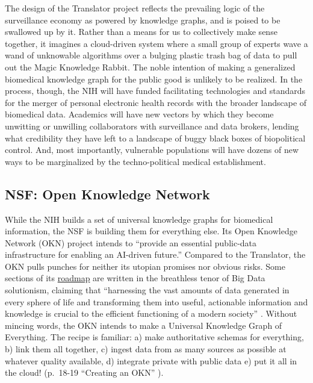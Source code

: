 \documentclass{article}
\begin{document}
The design of the Translator project reflects the prevailing logic of
the surveillance economy as powered by knowledge graphs, and is poised
to be swallowed up by it. Rather than a means for us to collectively
make sense together, it imagines a cloud-driven system where a small
group of experts wave a wand of unknowable algorithms over a bulging
plastic trash bag of data to pull out the Magic Knowledge Rabbit. The
noble intention of making a generalized biomedical knowledge graph for
the public good is unlikely to be realized. In the process, though, the
NIH will have funded facilitating technologies and standards for the
merger of personal electronic health records with the broader landscape
of biomedical data. Academics will have new vectors by which they become
unwitting or unwilling collaborators with surveillance and data brokers, lending what
credibility they have left to a landscape of buggy black boxes of
biopolitical control. And, most importantly, vulnerable populations will
have dozens of new ways to be marginalized by the techno-political
medical establishment.

\hypertarget{nsf-open-knowledge-network}{%
\subsection{NSF: Open Knowledge
Network}\label{nsf-open-knowledge-network}}

While the NIH builds a set of universal knowledge graphs for biomedical
information, the NSF is building them for everything else. Its Open
Knowledge Network (OKN) project intends to ``provide an essential
public-data infrastructure for enabling an AI-driven future.'' \cite{baruOpenKnowledgeNetwork2022}  Compared to the Translator, the OKN
pulls punches for neither its utopian promises nor obvious risks. Some
sections of its
\href{https://web.archive.org/web/20221028095757/https://nsf-gov-resources.nsf.gov/2022-09/OKN\%20Roadmap\%20-\%20Report_v03.pdf}{roadmap}
are written in the breathless tenor of Big Data solutionism, claiming
that ``harnessing the vast amounts of data generated in every sphere of
life and transforming them into useful, actionable information and
knowledge is crucial to the efficient functioning of a modern society''
\cite{baruOpenKnowledgeNetwork2022} . Without mincing words, the
OKN intends to make a Universal Knowledge Graph of Everything. The
recipe is familiar: a) make authoritative schemas for everything, b)
link them all together, c) ingest data from as many sources as possible
at whatever quality available, d) integrate private with public data e)
put it all in the cloud! (p.~18-19 ``Creating an OKN'' \cite{bigdatainteragencyworkinggroupOpenKnowledgeNetwork2018} ).
\end{document}
